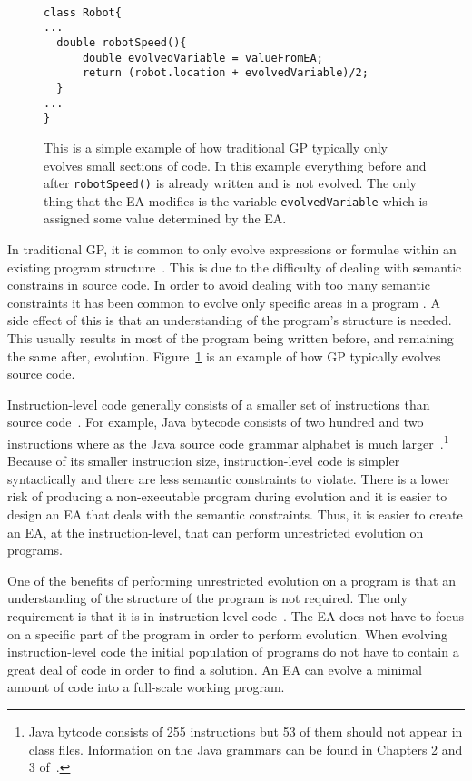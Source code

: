 \documentclass{sig-alternate}
\begin{document}
\begin{figure}
\centering
{\tt
\begin{verbatim}
class Robot{	
...
  double robotSpeed(){	
      double evolvedVariable = valueFromEA;
      return (robot.location + evolvedVariable)/2;
  }
...
}

\end{verbatim}
}
\caption{This is a simple example of how traditional GP typically only evolves small sections of code. In this example everything before and after \texttt{robotSpeed()} is already written and is not evolved. The only thing that the EA modifies is the variable \texttt{evolvedVariable} which is assigned some value determined by the EA.}
\label{traditional}
\end{figure}


In traditional GP, it is common to only evolve expressions or formulae within an existing program structure~\cite{FINCH:2011}. This is due to the difficulty of dealing with semantic constrains in source code. In order to avoid dealing with too many semantic constraints it has been common to evolve only specific areas in a program . A side effect of this is that an understanding of the program's structure is needed. This usually results in most of the program being written before, and remaining the same after, evolution. Figure~\ref{traditional} is an example of how GP typically evolves source code.\par

Instruction-level code generally consists of a smaller set of instructions than source code~\cite{Assembly:2010}. For example, Java bytecode consists of two hundred and two instructions where as the Java source code grammar alphabet is much larger~\cite{JVMspec:2013, Oracle:2013}.\footnote{Java bytcode consists of 255 instructions but 53 of them should not appear in class files. Information on the Java grammars can be found in Chapters 2 and 3 of~\cite{Oracle:2013}.} Because of its smaller instruction size, instruction-level code is simpler syntactically and there are less semantic constraints to violate. There is a lower risk of producing a non-executable program during evolution and it is easier to design an EA that deals with the semantic constraints. Thus, it is easier to create an EA, at the instruction-level, that can perform unrestricted evolution on programs.\par

One of the benefits of performing unrestricted evolution on a program is that an understanding of the structure of the program is not required. The only requirement is that it is in instruction-level code~\cite{FINCH2:2009, Assembly:2010}. The EA does not have to focus on a specific part of the program in order to perform evolution. When evolving instruction-level code the initial population of programs do not have to contain a great deal of code in order to find a solution. An EA can evolve a minimal amount of code into a full-scale working program.\par
\end{document}
